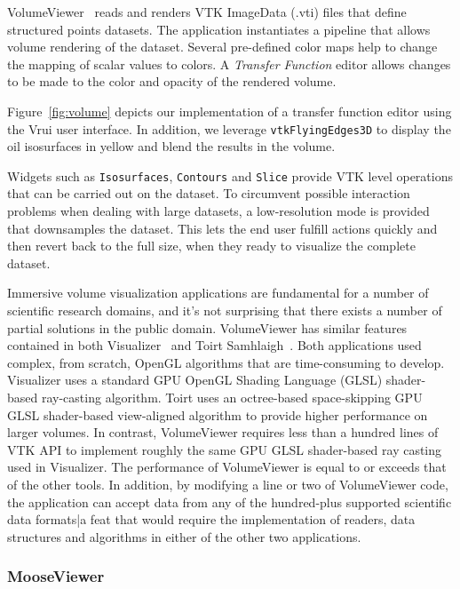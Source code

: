 VolumeViewer~\cite{VolumeViewer} reads and renders VTK ImageData (.vti) files that define structured points datasets.  The application instantiates a pipeline that allows volume rendering of the dataset. Several pre-defined color maps help to change the mapping of scalar values to colors. A \textit{Transfer Function} editor allows changes to be made to the color and opacity of the rendered volume.

Figure~\ref{fig:volume} depicts our implementation of a transfer function editor using the Vrui user interface. In addition, we leverage \texttt{vtkFlyingEdges3D} to display the oil isosurfaces in yellow and blend the results in the volume.

Widgets such as \texttt{Isosurfaces}, \texttt{Contours} and \texttt{Slice} provide VTK level operations that can be carried out on the dataset. To circumvent possible interaction problems when dealing with large datasets, a low-resolution mode is provided that downsamples the dataset. This lets the end user fulfill actions quickly and then revert back to the full size, when they ready to visualize the complete dataset.

Immersive volume visualization applications are fundamental for a number of scientific research domains, and it's not surprising that there exists a number of partial solutions in the public domain. VolumeViewer has similar features contained in both Visualizer~\cite{Billen:2008} and Toirt Samhlaigh~\cite{O'Leary:2008}. Both applications used complex, from scratch, OpenGL algorithms that are time-consuming to develop. Visualizer uses a standard GPU OpenGL Shading Language (GLSL) shader-based ray-casting algorithm. Toirt uses an octree-based space-skipping GPU GLSL shader-based view-aligned algorithm to provide higher performance on larger volumes. In contrast, VolumeViewer requires less than a hundred lines of VTK API to implement roughly the same GPU GLSL shader-based ray casting used in Visualizer. The performance of VolumeViewer is equal to or exceeds that of the other tools. In addition, by modifying a line or two of VolumeViewer code, the application can accept data from any of the hundred-plus supported scientific data formats|a feat that would require the implementation of readers, data structures and algorithms in either of the other two applications.

\subsubsection{MooseViewer}

